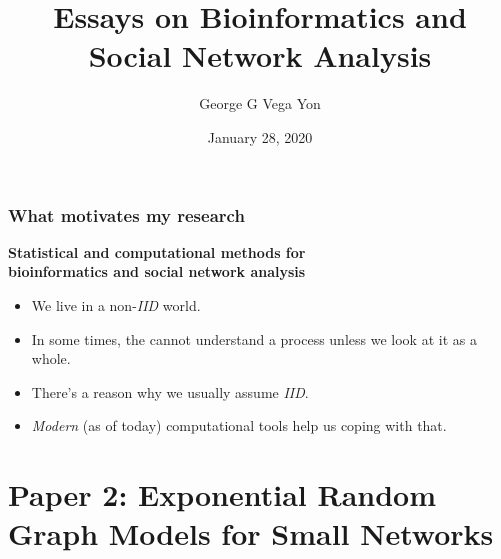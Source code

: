 \documentclass[aspectratio=169, 9pt]{beamer}\usepackage[]{graphicx}\usepackage[]{color}
\title[Stat. Comp. for Complex Systems]{Essays on Bioinformatics and
Social Network Analysis
\linebreak{\small Statistical and Computational Methods for
Complex Systems}}
\author[GGVY]{George G Vega Yon}
\institute[USC-PREVMED]{University of Southern California, Department of Preventive Medicine}
\date{January 28, 2020 }
\begin{document}

\begin{frame}%
\maketitle
\end{frame}

\begin{frame}
\frametitle{What motivates my research}

\begin{center}
\large
\textcolor{usccardinal}{\bf Statistical and computational methods for\\ %
bioinformatics and social network analysis}
\end{center}

\begin{itemize}[<+->]
\item We live in a non-{\it IID} world.
\item In some times, the cannot understand a process unless we look at it as a whole.
\item There's a reason why we usually assume {\it IID}.
\item {\it Modern} (as of today) computational tools help us coping with that.
\end{itemize}
\end{frame}



\section{Paper 2: Exponential Random Graph Models for Small Networks}

\end{document}
